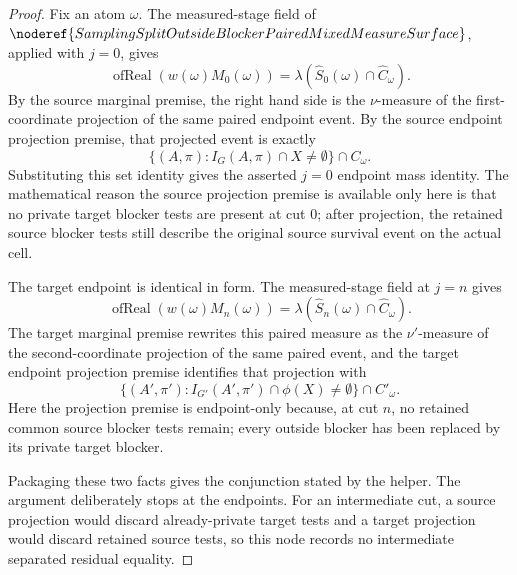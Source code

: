 \begin{proof}
Fix an atom \(\omega\).  The measured-stage field of
\(\noderef{SamplingSplitOutsideBlockerPairedMixedMeasureSurface}\), applied
with \(j=0\), gives
\[
  \operatorname{ofReal}(w(\omega)M_0(\omega))
  =\lambda(\widehat S_0(\omega)\cap\widehat C_\omega).
\]
By the source marginal premise, the right hand side is the \(\nu\)-measure of
the first-coordinate projection of the same paired endpoint event.  By the
source endpoint projection premise, that projected event is exactly
\[
  \{(A,\pi):I_G(A,\pi)\cap X\ne\emptyset\}\cap C_\omega.
\]
Substituting this set identity gives the asserted \(j=0\) endpoint mass
identity.  The mathematical reason the source projection premise is
available only here is that no private target blocker tests are present at
cut \(0\); after projection, the retained source blocker tests still describe
the original source survival event on the actual cell.

The target endpoint is identical in form.  The measured-stage field at
\(j=n\) gives
\[
  \operatorname{ofReal}(w(\omega)M_n(\omega))
  =\lambda(\widehat S_n(\omega)\cap\widehat C_\omega).
\]
The target marginal premise rewrites this paired measure as the
\(\nu'\)-measure of the second-coordinate projection of the same paired
event, and the target endpoint projection premise identifies that projection
with
\[
  \{(A',\pi'):I_{G'}(A',\pi')\cap\phi(X)\ne\emptyset\}\cap C'_\omega.
\]
Here the projection premise is endpoint-only because, at cut \(n\), no
retained common source blocker tests remain; every outside blocker has been
replaced by its private target blocker.

Packaging these two facts gives the conjunction stated by the helper.  The
argument deliberately stops at the endpoints.  For an intermediate cut, a
source projection would discard already-private target tests and a target
projection would discard retained source tests, so this node records no
intermediate separated residual equality.
\end{proof}
